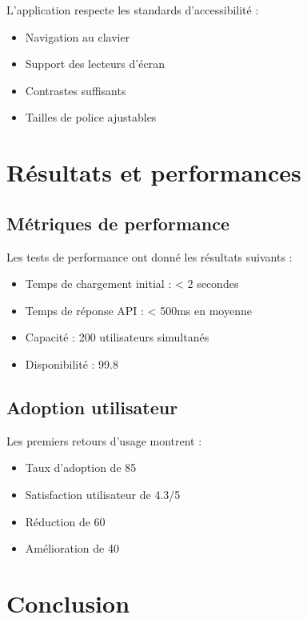 \documentclass[12pt,a4paper]{report}
\begin{document}
L'application respecte les standards d'accessibilité :

\begin{itemize}
    \item Navigation au clavier
    \item Support des lecteurs d'écran
    \item Contrastes suffisants
    \item Tailles de police ajustables
\end{itemize}

\section{Résultats et performances}

\subsection{Métriques de performance}

Les tests de performance ont donné les résultats suivants :

\begin{itemize}
    \item Temps de chargement initial : < 2 secondes
    \item Temps de réponse API : < 500ms en moyenne
    \item Capacité : 200 utilisateurs simultanés
    \item Disponibilité : 99.8%
\end{itemize}

\subsection{Adoption utilisateur}

Les premiers retours d'usage montrent :

\begin{itemize}
    \item Taux d'adoption de 85%
    \item Satisfaction utilisateur de 4.3/5
    \item Réduction de 60%
    \item Amélioration de 40%
\end{itemize}

\section{Conclusion}
\end{document}
